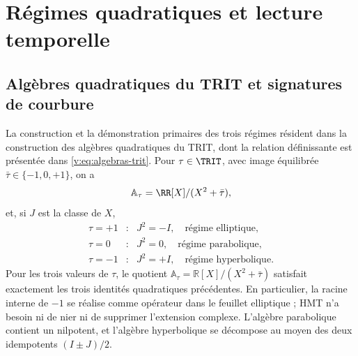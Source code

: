 \section{Régimes quadratiques et lecture temporelle}
\label{v:v:rec:chap:regimenes-cuadraticos-tiempo}

\subsection{Algèbres quadratiques du TRIT et signatures de courbure}
\label{v:v:rec:sec:regimenes-cuadraticos-recibidos}

La construction et la démonstration primaires des trois régimes résident dans
la construction des algèbres quadratiques du TRIT,
dont la relation définissante est présentée dans \eqref{v:eq:algebras-trit}. Pour
\(\tau\in\TRIT\), avec image équilibrée
\(\bar\tau\in\{-1,0,+1\}\), on a
\[
 \mathbb A_\tau=\RR[X]/(X^2+\bar\tau),
\]
et, si \(J\) est la classe de \(X\),
\[
\begin{array}{ccl}
 \tau=+1&:&J^2=-I,\quad\text{régime elliptique},\\
 \tau=0&:&J^2=0,\quad\text{régime parabolique},\\
 \tau=-1&:&J^2=+I,\quad\text{régime hyperbolique}.
\end{array}
\]
Pour les trois valeurs de \(\tau\), le quotient
\(\mathbb A_\tau=\mathbb R[X]/(X^2+\bar\tau)\) satisfait exactement les trois
identités quadratiques précédentes. En particulier, la racine interne de
\(-1\) se réalise comme opérateur dans le feuillet elliptique ; HMT n’a besoin ni de nier ni de
supprimer l’extension complexe. L’algèbre parabolique contient un nilpotent,
et l’algèbre hyperbolique se décompose au moyen des deux idempotents
\((I\pm J)/2\).

